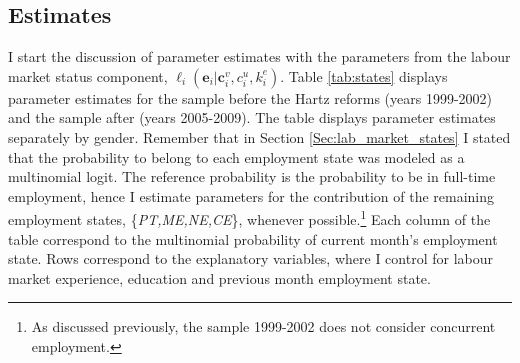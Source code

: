 \documentclass[12pt, a4paper]{article}
\let\Oldsubsection\subsection
\renewcommand{\subsection}{\FloatBarrier\Oldsubsection}
\begin{document}
%
%
%
%
%
%
%
%
%
%
%
%

\subsection{Estimates}\label{Sec:Estimates}

I start the discussion of parameter estimates with the parameters from the labour market status component, $\ell_{i}(\textbf{e}_i|\textbf{c}_{i}^{v},c_{i}^{u},k^e_{i})$. Table \ref{tab:states} displays parameter estimates for the sample before the Hartz reforms (years 1999-2002) and the sample after (years 2005-2009). The table displays parameter estimates separately by gender. Remember that in Section \ref{Sec:lab_market_states} I stated that the probability to belong to each employment state was modeled as a multinomial logit. The reference probability is the probability to be in full-time employment, hence I estimate parameters for the contribution of the remaining employment states, \{\emph{PT,ME,NE,CE}\}, whenever possible.\footnote{As discussed previously, the sample 1999-2002 does not consider concurrent employment.} Each column of the table correspond to the multinomial probability of current month's employment state. Rows correspond to the explanatory variables, where I control for labour market experience, education and previous month employment state.
\end{document}
